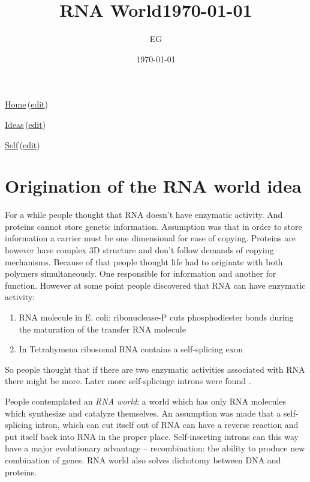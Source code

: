 \documentclass[12pt]{paper}
\title{RNA World\today}
\author{EG}
\date{\today}
\newcommand{\wikilink}[2] { \href{#1.pdf}{#2}\,(\href{#1.tex}{edit})}
\begin{document}
 \maketitle
\wikilink{home}{Home}

\wikilink{ideas}{Ideas}

\wikilink{ran_world}{Self}

\tableofcontents

\section{Origination of the RNA world idea}

For a while people thought that RNA doesn't have enzymatic activity. And proteins cannot store 
genetic information. Assumption was that in order to store information a carrier must be one 
dimensional for ease of copying. Proteins are however have complex 3D structure and don't follow 
demands of copying mechanisms. 
 Because of that people thought life had to originate with both polymers 
simultaneously. One responsible for information and another for function. However at some point 
people discovered that RNA can have enzymatic activity:\
\begin{enumerate}
 \item RNA molecule in E. coli: ribonuclease-P cuts phosphodiester bonds during the maturation of 
the transfer RNA molecule\cite{Guerrier-Takada1983,Guerrier-Takada1984}
\item In Tetrahymena ribosomal RNA contains a self-splicing exon \cite{Cech1981,Kruger1982}
\end{enumerate}
So people thought that if there are two enzymatic activities associated with RNA there might be 
more. Later more self-splicinge introns were found \cite{Cech1986}.

People contemplated an \textit{RNA world}: a world which has only RNA molecules which synthesize 
and catalyze themselves. An assumption was made that a self-splicing intron, which can cut itself 
out of RNA can have a reverse reaction and put itself back into RNA in the proper place. 
Self-inserting introns can this way have a major evolutionary advantage -- recombination: the 
ability to produce new combination of genes. RNA world also solves dichotomy between DNA and 
proteins. 
\end{document}
